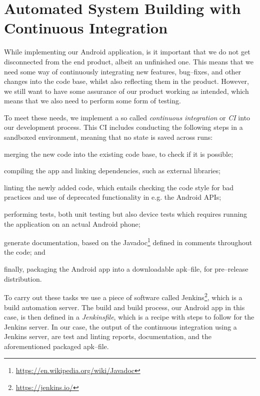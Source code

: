 \section{Automated System Building with Continuous Integration}
While implementing our Android application, is it important that we do not get disconnected from the end product, albeit an unfinished one.
This means that we need some way of continuously integrating new features, bug--fixes, and other changes into the code base, whilst also reflecting them in the product.
However, we still want to have some assurance of our product working as intended, which means that we also need to perform some form of testing.

\bigskip
To meet these needs, we implement a so called \textit{continuous integration} or \textit{CI} into our development process.
This CI includes conducting the following steps in a sandboxed environment, meaning that no state is saved across runs:
\begin{enumberate}
\item merging the new code into the existing code base, to check if it is possible;
\item compiling the app and linking dependencies, such as external libraries;
\item linting the newly added code, which entails checking the code style for bad practices and use of deprecated functionality in e.g. the Android APIs;
\item performing tests, both unit testing but also device tests which requires running the application on an actual Android phone;
\item generate documentation, based on the Javadoc\footnote{\url{https://en.wikipedia.org/wiki/Javadoc}} defined in comments throughout the code; and
\item finally, packaging the Android app into a downloadable apk--file, for pre--release distribution.
\end{enumberate}

To carry out these tasks we use a piece of software called Jenkins\footnote{\url{https://jenkins.io/}}, which is a build automation server.
The build and build process, our Android app in this case, is then defined in a \textit{Jenkinsfile}, which is a recipe with steps to follow for the Jenkins server.
In our case, the output of the continuous integration using a Jenkins server, are test and linting reports, documentation, and the aforementioned packaged apk--file.


